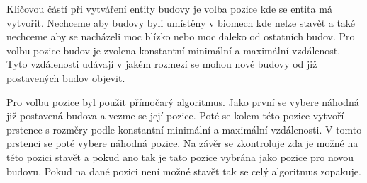Klíčovou částí při vytváření entity budovy je volba pozice kde se entita má vytvořit. Nechceme aby budovy byli umístěny v biomech kde nelze stavět a také nechceme aby se nacházeli moc blízko nebo moc daleko od ostatních budov. Pro volbu pozice budov je zvolena konstantní minimální a maximální vzdálenost. Tyto vzdálenosti udávají v jakém rozmezí se mohou nové budovy od již postavených budov objevit.

Pro volbu pozice byl použit přímočarý algoritmus. Jako první se vybere náhodná již postavená budova a vezme se její pozice. Poté se kolem této pozice vytvoří prstenec s rozměry podle konstantní minimální a maximální vzdálenosti. V tomto prstenci se poté vybere náhodná pozice. Na závěr se zkontroluje zda je možné na této pozici stavět a pokud ano tak je tato pozice vybrána jako pozice pro novou budovu. Pokud na dané pozici není možné stavět tak se celý algoritmus zopakuje.






































